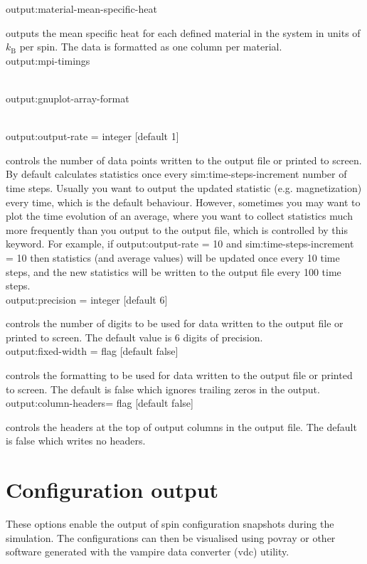 {\zicf output:material-mean-specific-heat} outputs the
mean specific heat for each defined material in the system in units of $k_{\mathrm{B}}$ per spin. The data is formatted as
one column per material.\\

{\zicf output:mpi-timings}\\

{\zicf output:gnuplot-array-format}\\

{\zicf output:output-rate = integer [default 1]}
controls the number of data points written to the output file or printed to screen. By default \vampire
calculates statistics once every sim:time-steps-increment number of time steps. Usually you want to
output the updated statistic (e.g. magnetization) every time, which is the default behaviour. However,
sometimes you may want to plot the time evolution of an average, where you want to collect statistics
much more frequently than you output to the output file, which is controlled by this keyword. For
example, if output:output-rate = 10 and sim:time-steps-increment = 10 then statistics (and average
values) will be updated once every 10 time steps, and the new statistics will be written to the output
file every 100 time steps.\\

{\zicf output:precision = integer [default 6]} controls
the number of digits to be used for data written to the output file or printed to screen. The default value
is 6 digits of precision. \\

{\zicf output:fixed-width = flag [default false]} controls
the formatting to be used for data written to the output file or printed to screen. The default is false which
ignores trailing zeros in the output.\\

{\zicf output:column-headers= flag [default false]} controls
the headers at the top of output columns in the output file. The default is false which writes no headers.\\

\section*{Configuration output}
These options enable the output of spin configuration snapshots during the
simulation. The configurations can then be visualised using povray or other
software generated with the vampire data converter (vdc) utility.\\

